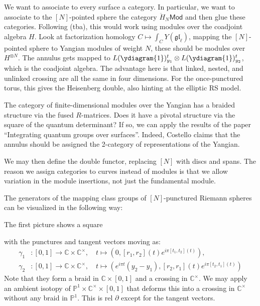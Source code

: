 \documentclass[11pt]{report}
\theoremstyle{definition}
\theoremstyle{remark}
\theoremstyle{remark}
\newcommand{\id}{\textnormal{id}}
\newcommand{\C}{\mathbb{C}}
\renewcommand{\P}{\mathbb{P}}
\begin{document}
We want to associate to every surface a category. In particular, we want to associate to the $[N]$-pointed sphere the category $\ddot H_N\mathsf{Mod}$ and then glue these categories. Following (tba), this would work using modules over the coadjoint algebra $H$. Look at factorization homology $C \mapsto \int_C Y(\mathfrak{gl}_\ell)$, mapping the $[N]$-pointed sphere to Yangian modules of weight $N$, these should be modules over $H^{\otimes N}$. The annulus gets mapped to $L(\ydiagram{1})_{y_1}^t \otimes L(\ydiagram{1})_{y_2}^t$, which is the coadjoint algebra. The advantage here is that linked, nested, and unlinked crossing are all the same in four dimensions. For the once-punctured torus, this gives the Heisenberg double, also hinting at the elliptic RS model.

The category of finite-dimensional modules over the Yangian has a braided structure via the fused $R$-matrices. Does it have a pivotal structure via the square of the quantum determinant? If so, we can apply the results of the paper “Integrating quantum groups over surfaces”. Indeed, Costello claims that the annulus should be assigned the 2-category of representations of the Yangian.

We may then define the double functor, replacing $[N]$ with discs and spans. The reason we assign categories to curves instead of modules is that we allow variation in the module insertions, not just the fundamental module.

\pagebreak

The generators of the mapping class groups of $[N]$-punctured Riemann spheres can be visualized in the following way:

The first picture shows a square
\begin{center}
\end{center}
with the punctures and tangent vectors moving as:
\begin{align*}
\gamma_1&: [0,1] \to \C \times \C^\times, \quad t \mapsto (0,[r_1,r_2](t) e^{i \pi [t_1,t_2](t)}), \\
\gamma_2&: [0,1] \to \C \times \C^\times, \quad t \mapsto (e^{i \pi t} (y_2-y_1),[r_2,r_1](t) e^{i \pi [t_2,t_1](t)})
\end{align*}
Note that they form a braid in $\C \times [0,1]$ and a crossing in $\C^\times$. We may apply an ambient isotopy of $\P^1 \times \C^\times \times [0,1]$ that deforms this into a crossing in $\C^\times$ without any braid in $\P^1$. This is rel $\partial$ except for the tangent vectors.
\end{document}
